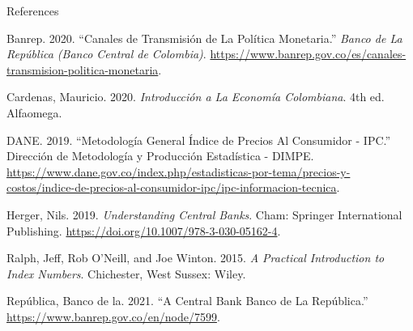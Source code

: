 \documentclass[
  ignorenonframetext,
]{beamer}
\newlength{\cslhangindent}
\newenvironment{CSLReferences}[2] %
 {\begin{list}{}{%
  \setlength{\itemindent}{0pt}
  \setlength{\leftmargin}{0pt}
  \setlength{\parsep}{0pt}
  \ifodd #1
   \setlength{\leftmargin}{\cslhangindent}
   \setlength{\itemindent}{-1\cslhangindent}
  \fi
  \setlength{\itemsep}{#2\baselineskip}}}
 {\end{list}}
\begin{document}
\begin{frame}[allowframebreaks]{References}
\label{refs}
\begin{CSLReferences}{1}{0}
Banrep. 2020. {``Canales de Transmisión de La Política Monetaria.''}
\emph{Banco de La República (Banco Central de Colombia)}.
\url{https://www.banrep.gov.co/es/canales-transmision-politica-monetaria}.

Cardenas, Mauricio. 2020. \emph{Introducción a La {Economía}
{Colombiana}}. 4th ed. Alfaomega.

DANE. 2019. {``Metodología {General} Índice de {Precios} Al {Consumidor}
- {IPC}.''} Dirección de Metodología y Producción Estadística - DIMPE.
\url{https://www.dane.gov.co/index.php/estadisticas-por-tema/precios-y-costos/indice-de-precios-al-consumidor-ipc/ipc-informacion-tecnica}.

Herger, Nils. 2019. \emph{Understanding {Central} {Banks}}. Cham:
Springer International Publishing.
\url{https://doi.org/10.1007/978-3-030-05162-4}.

Ralph, Jeff, Rob O'Neill, and Joe Winton. 2015. \emph{A Practical
Introduction to Index Numbers}. Chichester, West Sussex: Wiley.

República, Banco de la. 2021. {``A {Central} {Bank} {\textbar} {Banco}
de La {República}.''} \url{https://www.banrep.gov.co/en/node/7599}.

\end{CSLReferences}
\end{frame}
\end{document}
